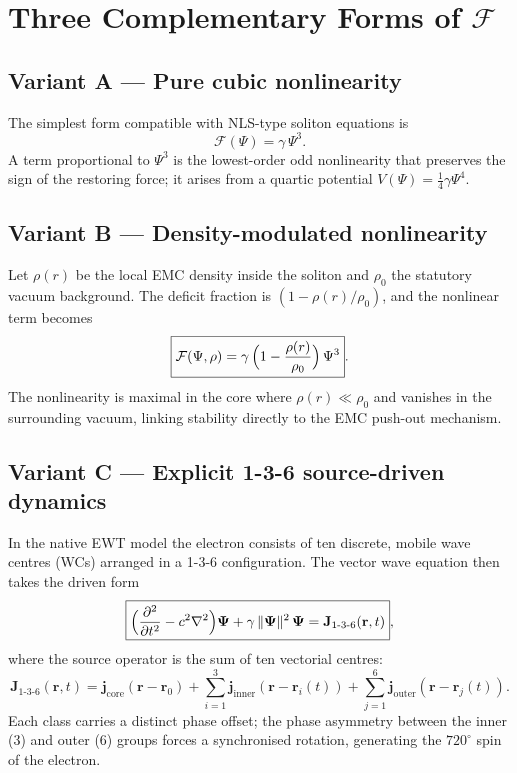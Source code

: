 \documentclass[11pt,a4paper]{article}
\begin{document}
	\section{Three Complementary Forms of $\mathcal{F}$}
	
	\subsection*{Variant A --- Pure cubic nonlinearity}
	The simplest form compatible with NLS-type soliton equations is
	\begin{equation}\label{eq:F_cubic}
		\boxed{\mathcal{F}(\Psi) = \gamma\,\Psi^{3}} .
	\end{equation}
	A term proportional to $\Psi^{3}$ is the lowest-order odd nonlinearity
	that preserves the sign of the restoring force; it arises from a quartic
	potential $V(\Psi)=\tfrac{1}{4}\gamma\Psi^{4}$.
	
	\subsection*{Variant B --- Density-modulated nonlinearity}
	Let $\rho(r)$ be the local EMC density inside the soliton and $\rho_{0}$
	the statutory vacuum background.  The deficit fraction is
	$(1-\rho(r)/\rho_{0})$, and the nonlinear term becomes
	\begin{equation}\label{eq:F_density}
		\boxed{\mathcal{F}(\Psi,\rho)
			= \gamma\,\Bigl(1-\frac{\rho(r)}{\rho_{0}}\Bigr)\,\Psi^{3}} .
	\end{equation}
	The nonlinearity is maximal in the core where $\rho(r) \ll \rho_{0}$ and
	vanishes in the surrounding vacuum, linking stability directly to the
	EMC push-out mechanism.
	
	\subsection*{Variant C --- Explicit 1-3-6 source-driven dynamics}
	In the native EWT model the electron consists of ten discrete, mobile
	wave centres (WCs) arranged in a 1-3-6 configuration.  The vector wave
	equation then takes the driven form
	\begin{equation}\label{eq:F_source}
		\boxed{\Bigl( \frac{\partial^{2}}{\partial t^{2}} - c^{2}\nabla^{2} \Bigr)
			\mathbf{\Psi} + \gamma\,\|\mathbf{\Psi}\|^{2}\,\mathbf{\Psi}
			= \mathbf{J}_{1\text{-}3\text{-}6}(\mathbf{r},t)} ,
	\end{equation}
	where the source operator is the sum of ten vectorial centres:
	\begin{equation}\label{eq:J}
		\mathbf{J}_{1\text{-}3\text{-}6}(\mathbf{r},t) =
		\mathbf{j}_{\text{core}}(\mathbf{r} - \mathbf{r}_{0})
		+ \sum_{i=1}^{3} \mathbf{j}_{\text{inner}}(\mathbf{r} - \mathbf{r}_{i}(t))
		+ \sum_{j=1}^{6} \mathbf{j}_{\text{outer}}(\mathbf{r} - \mathbf{r}_{j}(t)) .
	\end{equation}
	Each class carries a distinct phase offset; the phase asymmetry between
	the inner (3) and outer (6) groups forces a synchronised rotation,
	generating the $720^{\circ}$ spin of the electron.
	
\end{document}
